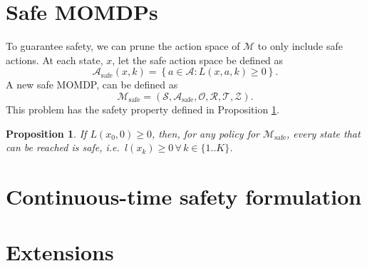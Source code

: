 \documentclass{article}
\newtheorem{prop}{Proposition}
\newcommand{\sspace}{\ensuremath{\mathcal{S}} }
\newcommand{\aspace}{\ensuremath{\mathcal{A}} }
\newcommand{\ospace}{\ensuremath{\mathcal{O}} }
\newcommand{\tdist}{\ensuremath{\mathcal{T}} }
\newcommand{\odist}{\ensuremath{\mathcal{Z}} }
\newcommand{\reward}{\ensuremath{\mathcal{R}} }
\begin{document}
\section{Safe MOMDPs}

To guarantee safety, we can prune the action space of $\mathcal{M}$ to only include safe actions. At each state, $x$, let the safe action space be defined as
\begin{equation}
    \aspace_\text{safe}(x, k) = \left\{a \in \aspace : L(x,a,k) \geq 0 \right\} \text{.}
\end{equation}
A new safe MOMDP, can be defined as
\begin{equation}
    \mathcal{M}_\text{safe} = (\sspace, \aspace_\text{safe}, \ospace, \reward, \tdist, \odist) \text{.}
\end{equation}
This problem has the safety property defined in Proposition \ref{prop:safe}.

\begin{prop}
    If $L(x_0, 0)\geq 0$, then, for any policy for $\mathcal{M}_\text{safe}$, every state that can be reached is safe, i.e.\ $l(x_k) \geq 0 \, \forall\, k \in \{1..K\}$.
    \label{prop:safe}
\end{prop}


%     

% 

\section{Continuous-time safety formulation}


\section{Extensions}
\end{document}

